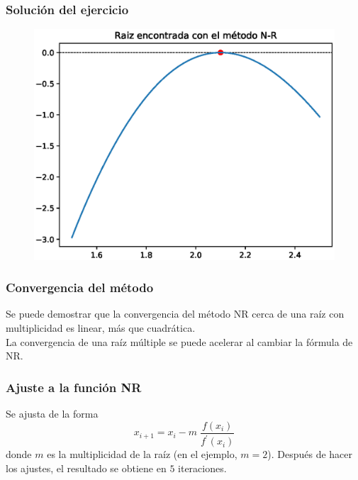 \begin{frame}
\frametitle{Solución del ejercicio}
\begin{figure}
	\centering
	\includegraphics[scale=0.5]{Imagenes/Raiz_NR_02.eps}
\end{figure}
\end{frame}
\begin{frame}
\frametitle{Convergencia del método}
Se puede demostrar que la convergencia del método NR cerca de una raíz con multiplicidad es linear, más que cuadrática.
\\
\bigskip
\pause
La convergencia de una raíz múltiple se puede acelerar al cambiar la fórmula de NR.
\end{frame}
\begin{frame}
\frametitle{Ajuste a la función NR}
Se ajusta de la forma
\[ x_{i + 1} = x_{i} - m \; \dfrac{f(x_{i})}{f^{\prime}(x_{i})} \]
donde $m$ es la multiplicidad de la raíz (en el ejemplo, $m = 2$). Después de hacer los ajustes, el resultado se obtiene en $5$ iteraciones.
\end{frame}
